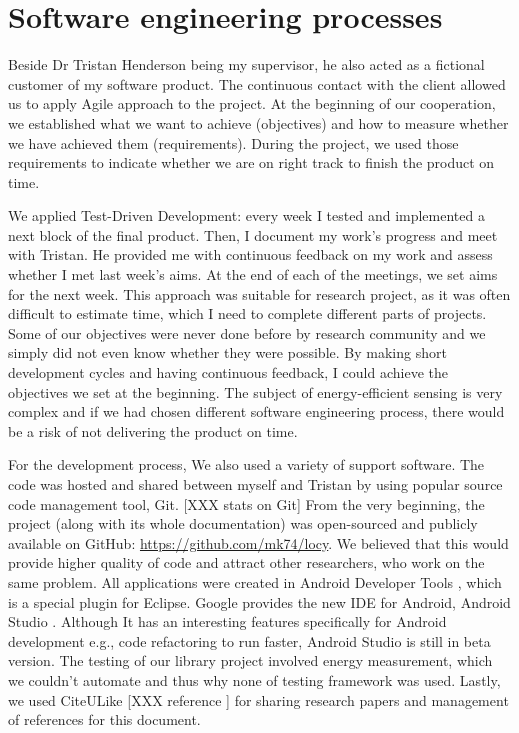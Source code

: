 \section{Software engineering processes}
\label{s:processes}
Beside Dr Tristan Henderson being my supervisor, he also acted as a fictional customer of my software product. The continuous contact with the client allowed us to apply Agile approach to the project. At the beginning of our cooperation,  we established what we want to achieve (objectives) and how to measure whether we have achieved them (requirements). During the project, we used those requirements to indicate whether we are on right track to finish the product on time.

We applied Test-Driven Development: every week I tested and implemented a next block of the final product. Then, I document my work's progress and meet with Tristan. He provided me with continuous feedback on my work and assess whether I met last week's aims. At the end of each of the meetings, we set aims for the next week. This approach was suitable for research project, as it was often difficult to estimate time, which I need to complete different parts of projects. Some of our objectives were never done before by research community and we simply did not even know whether they were possible. By making short development cycles and having continuous feedback, I could achieve the objectives we set at the beginning. The subject of energy-efficient sensing is very complex and if we had chosen different software engineering process, there would be a risk of not delivering the product on time. 
			
For the development process, We also used a variety of support software. The code was hosted and shared between myself and Tristan by using popular source code management tool, Git. [XXX stats on Git] From the very beginning, the project (along with its whole documentation) was open-sourced and publicly available on GitHub: \url{https://github.com/mk74/locy}. We believed that this would provide higher quality of code and attract other researchers, who work on the same problem. All applications were created in Android Developer Tools \cite{google:adt}, which is a special plugin for Eclipse. Google provides the new IDE for Android, Android Studio \cite{google:androidstudio}. Although It has an interesting features specifically for Android development e.g., code refactoring to run faster, Android Studio is still in beta version. The testing of our library project involved energy measurement, which we couldn't automate and thus why none of testing framework was used. Lastly, we used CiteULike [XXX reference ] for sharing research papers and management of references for this document.
	